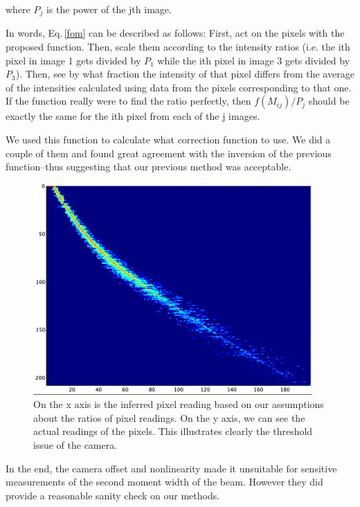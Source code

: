 where $P_j$ is the power of the jth image.

In words, Eq.\,\ref{fom} can be described as follows: First, act on the pixels with the proposed function. Then, scale them according to the intensity ratios (i.e. the ith pixel in image 1 gets divided by $P_1$ while the ith pixel in image 3 gets divided by $P_3$). Then, see by what fraction the intensity of that pixel differs from the average of the intensities calculated using data from the pixels corresponding to that one. If the function really were to find the ratio perfectly, then $f(M_{ij})/P_j$ should be exactly the same for the ith pixel from each of the j images. 


We used this function to calculate what correction function to use. We did a couple of them and found great agreement with the inversion of the previous function--thus suggesting that our previous method was acceptable. 


\begin{figure}
\centerline{
\includegraphics[width=0.95\textwidth]{cameraPixelFit}
}
\caption[Camera Linearity and Offset]{On the x axis is the inferred pixel reading based on our assumptions about the ratios of pixel readings. On the y axis, we can see the actual readings of the pixels. This illustrates clearly the threshold issue of the camera.}
\end{figure}

In the end, the camera offset and nonlinearity made it unsuitable for sensitive measurements of the second moment width of the beam. However they did provide a reasonable sanity check on our methods.
%
